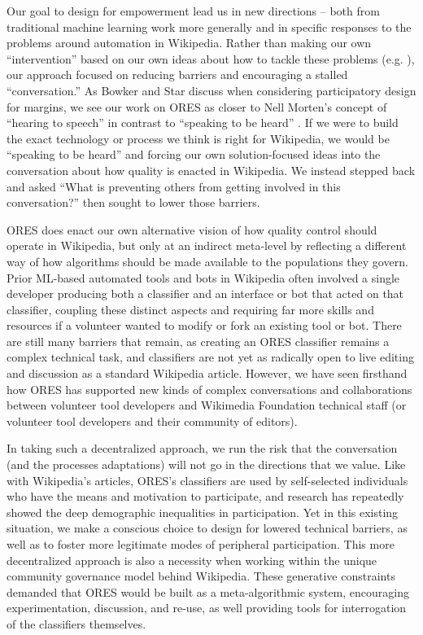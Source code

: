 Our goal to design for empowerment lead us in new directions -- both from traditional machine learning work more generally and in specific responses to the problems around automation in Wikipedia. Rather than making our own ``intervention'' based on our own ideas about how to tackle these problems (e.g. \cite{halfaker2014snuggle}), our approach focused on reducing barriers and encouraging a stalled ``conversation.'' As Bowker and Star discuss when considering participatory design for margins\cite{bowker1999sorting}, we see our work on ORES as closer to Nell Morten's concept of ``hearing to speech'' in contrast to ``speaking to be heard'' \cite{morton1985journey}. If we were to build the exact technology or process we think is right for Wikipedia, we would be ``speaking to be heard'' and forcing our own solution-focused ideas into the conversation about how quality is enacted in Wikipedia. We instead stepped back and asked ``What is preventing others from getting involved in this conversation?'' then sought to lower those barriers.

ORES does enact our own alternative vision of how quality control should operate in Wikipedia, but only at an indirect meta-level by reflecting a different way of how algorithms should be made available to the populations they govern. Prior ML-based automated tools and bots in Wikipedia often involved a single developer producing both a classifier and an interface or bot that acted on that classifier, coupling these distinct aspects and requiring far more skills and resources if a volunteer wanted to modify or fork an existing tool or bot. There are still many barriers that remain, as creating an ORES classifier remains a complex technical task, and classifiers are not yet as radically open to live editing and discussion as a standard Wikipedia article. However, we have seen firsthand how ORES has supported new kinds of complex conversations and collaborations between volunteer tool developers and Wikimedia Foundation technical staff (or volunteer tool developers and their community of editors).

In taking such a decentralized approach, we run the risk that the conversation (and the processes adaptations) will not go in the directions that we value. Like with Wikipedia's articles, ORES's classifiers are used by self-selected individuals who have the means and motivation to participate, and research has repeatedly showed the deep demographic inequalities in participation\cite{lam2011wp,graham2014uneven}. Yet in this existing situation, we make a conscious choice to design for lowered technical barriers, as well as to foster more legitimate modes of peripheral participation. This more decentralized approach is also a necessity when working within the unique community governance model behind Wikipedia.  These generative constraints demanded that ORES would be built as a meta-algorithmic system, encouraging experimentation, discussion, and re-use, as well providing tools for interrogation of the classifiers themselves.

